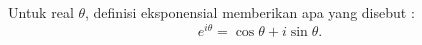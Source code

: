 
Untuk real $\theta$, definisi eksponensial memberikan apa yang disebut
\emph{}:
\begin{equation*}
e^{i\theta}
=
\cos \theta + i \sin \theta .
\end{equation*}
